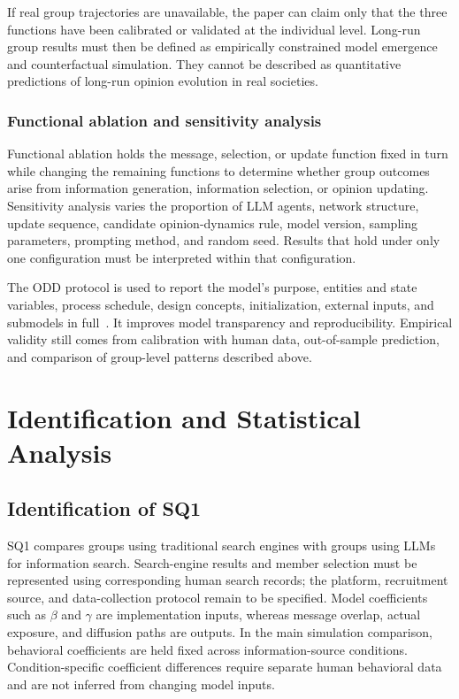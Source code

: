 \documentclass[11pt,a4paper]{article}
\begin{document}
If real group trajectories are unavailable, the paper can claim only that the three functions have been calibrated or validated at the individual level. Long-run group results must then be defined as empirically constrained model emergence and counterfactual simulation. They cannot be described as quantitative predictions of long-run opinion evolution in real societies.

\subsubsection{Functional ablation and sensitivity analysis}

Functional ablation holds the message, selection, or update function fixed in turn while changing the remaining functions to determine whether group outcomes arise from information generation, information selection, or opinion updating. Sensitivity analysis varies the proportion of LLM agents, network structure, update sequence, candidate opinion-dynamics rule, model version, sampling parameters, prompting method, and random seed. Results that hold under only one configuration must be interpreted within that configuration.

The ODD protocol is used to report the model's purpose, entities and state variables, process schedule, design concepts, initialization, external inputs, and submodels in full~\citep{grimm2020}. It improves model transparency and reproducibility. Empirical validity still comes from calibration with human data, out-of-sample prediction, and comparison of group-level patterns described above.

\section{Identification and Statistical Analysis}

\subsection{Identification of SQ1}

SQ1 compares groups using traditional search engines with groups using LLMs for information search. Search-engine results and member selection must be represented using corresponding human search records; the platform, recruitment source, and data-collection protocol remain to be specified. Model coefficients such as $\beta$ and $\gamma$ are implementation inputs, whereas message overlap, actual exposure, and diffusion paths are outputs. In the main simulation comparison, behavioral coefficients are held fixed across information-source conditions. Condition-specific coefficient differences require separate human behavioral data and are not inferred from changing model inputs.
\end{document}
